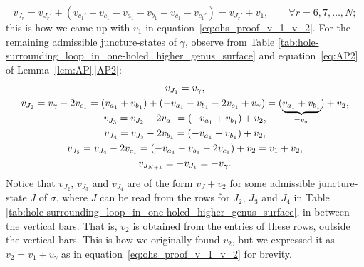 \documentclass[pdftex]{sigma}
\numberwithin{equation}{section}
\theoremstyle{definition}
\begin{document}
\[
v_{J_r} = v_{J_r'} + (v_{c_1'} - v_{c_1} - v_{a_1} - v_{b_1} - v_{c_1} - v_{c_1'})
= v_{J_r'} + v_1, \qquad \forall r = 6,7,\dots,N;
\]
this is how we came up with $v_1$ in equation~\eqref{eq:ohs_proof_v_1_v_2}.
For the remaining admissible juncture-states of $\gamma$, observe from Table \ref{tab:hole-surrounding_loop_in_one-holed_higher_genus_surface} and equation~\eqref{eq:AP2} of Lemma~\ref{lem:AP}\,\ref{AP2}:
\begin{gather*}
v_{J_1} = v_\gamma, \\
v_{J_2} = v_\gamma - 2 v_{c_1}
= (v_{a_1} + v_{b_1}) + (-v_{a_1} - v_{b_1} - 2v_{c_1} + v_\gamma)
= \smash{(\underbrace{ v_{a_1} + v_{b_1} }_{=v_\sigma})} + v_2, \\
v_{J_3} = v_{J_2} - 2v_{a_1} = (-v_{a_1} + v_{b_1}) + v_2, \\
v_{J_4} = v_{J_3} - 2v_{b_1} = ( - v_{a_1} - v_{b_1}) + v_2, \\
v_{J_5} = v_{J_4} - 2v_{c_1} = (- v_{a_1} - v_{b_1} - 2v_{c_1}) + v_2 = v_1 + v_2, \\
v_{J_{N+1}} = - v_{J_1} = - v_\gamma.
\end{gather*}
Notice that $v_{J_2}$, $v_{J_3}$ and $v_{J_4}$ are of the form $v_J + v_2$ for some admissible juncture-state $J$ of $\sigma$, where $J$ can be read from the rows for $J_2$, $J_3$ and $J_4$ in Table \ref{tab:hole-surrounding_loop_in_one-holed_higher_genus_surface}, in between the vertical bars. That is, $v_2$ is obtained from the entries of these rows, outside the vertical bars. This is how we originally found $v_2$, but we expressed it as $v_2 = v_1 + v_\gamma$ as in equation~\eqref{eq:ohs_proof_v_1_v_2} for brevity.
\end{document}
